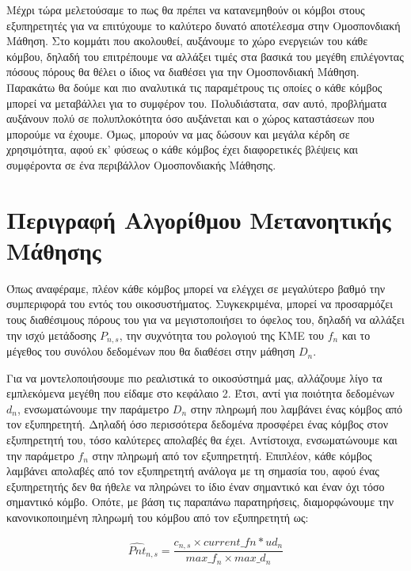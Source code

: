 Μέχρι τώρα μελετούσαμε το πως θα πρέπει να κατανεμηθούν οι κόμβοι στους εξυπηρετητές για να επιτύχουμε το καλύτερο δυνατό αποτέλεσμα στην Ομοσπονδιακή Μάθηση. Στο κομμάτι που ακολουθεί, αυξάνουμε το χώρο ενεργειών του κάθε κόμβου, δηλαδή του επιτρέπουμε να αλλάξει τιμές στα βασικά του μεγέθη επιλέγοντας πόσους πόρους θα θέλει ο ίδιος να διαθέσει για την Ομοσπονδιακή Μάθηση. Παρακάτω θα δούμε και πιο αναλυτικά τις παραμέτρους τις οποίες ο κάθε κόμβος μπορεί να μεταβάλλει για το συμφέρον του. Πολυδιάστατα, σαν αυτό, προβλήματα αυξάνουν πολύ σε πολυπλοκότητα όσο αυξάνεται και ο χώρος καταστάσεων που μπορούμε να έχουμε. Όμως, μπορούν να μας δώσουν και μεγάλα κέρδη σε χρησιμότητα, αφού εκ' φύσεως ο κάθε κόμβος έχει διαφορετικές βλέψεις και συμφέροντα σε ένα περιβάλλον Ομοσπονδιακής Μάθησης.

\section{Περιγραφή Αλγορίθμου Μετανοητικής Μάθησης}

Όπως αναφέραμε, πλέον κάθε κόμβος μπορεί να ελέγχει σε μεγαλύτερο βαθμό την συμπεριφορά του εντός του οικοσυστήματος. Συγκεκριμένα, μπορεί να προσαρμόζει τους διαθέσιμους πόρους του για να μεγιστοποιήσει το όφελος του, δηλαδή να αλλάξει την ισχύ μετάδοσης $P_{n,s}$, την συχνότητα του ρολογιού της ΚΜΕ του $f_n$ και το μέγεθος του συνόλου δεδομένων που θα διαθέσει στην μάθηση $D_n$.

Για να μοντελοποιήσουμε πιο ρεαλιστικά το οικοσύστημά μας, αλλάζουμε λίγο τα εμπλεκόμενα μεγέθη που είδαμε στο κεφάλαιο 2. Έτσι, αντί για ποιότητα δεδομένων $d_n$, ενσωματώνουμε την παράμετρο $D_n$ στην πληρωμή που λαμβάνει ένας κόμβος από τον εξυπηρετητή. Δηλαδή όσο περισσότερα δεδομένα προσφέρει ένας κόμβος στον εξυπηρετητή του, τόσο καλύτερες απολαβές θα έχει. Αντίστοιχα, ενσωματώνουμε και την παράμετρο $f_n$ στην πληρωμή από τον εξυπηρετητή. Επιπλέον, κάθε κόμβος λαμβάνει απολαβές από τον εξυπηρετητή ανάλογα με τη σημασία του, αφού ένας εξυπηρετητής δεν θα ήθελε να πληρώνει το ίδιο έναν σημαντικό και έναν όχι τόσο σημαντικό κόμβο. Οπότε, με βάση τις παραπάνω παρατηρήσεις, διαμορφώνουμε την κανονικοποιημένη πληρωμή του κόμβου από τον εξυπηρετητή ως:

\vspace{-5pt}

\begin{equation}
\hat{Pnt}_{n,s}=\frac{c_{n,s}\times current\_fn*ud_n}{max\_f_n\times max\_d_n}
\label{eq20}
\end{equation}

